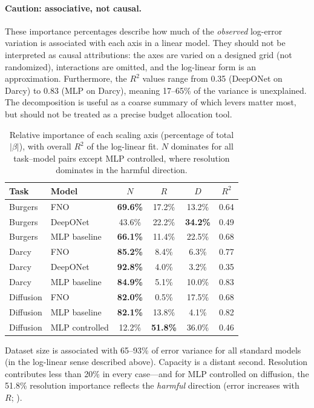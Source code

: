 \documentclass[11pt]{article}
\begin{document}
\paragraph{Caution: associative, not causal.}
These importance percentages describe how much of the \emph{observed}
log-error variation is associated with each axis in a linear model.
They should not be interpreted as causal attributions: the axes are
varied on a designed grid (not randomized), interactions are omitted,
and the log-linear form is an approximation.
Furthermore, the $R^2$ values range from 0.35 (DeepONet on Darcy)
to 0.83 (MLP on Darcy), meaning 17--65\% of the variance is
unexplained.
The decomposition is useful as a coarse summary of which levers
matter most, but should not be treated as a precise budget
allocation tool.

\begin{table}[h]
\centering
\caption{Relative importance of each scaling axis
(percentage of total $|\beta|$), with overall $R^2$ of the
log-linear fit. $N$ dominates for all task--model pairs
except MLP controlled, where resolution dominates in the
harmful direction.}
\label{tab:importance}
\begin{tabular}{@{}llcccc@{}}
\toprule
\textbf{Task} & \textbf{Model} & $N$ & $R$ & $D$ & $R^2$ \\
\midrule
Burgers   & FNO          & \textbf{69.6\%} & 17.2\% & 13.2\% & 0.64 \\
Burgers   & DeepONet     & 43.6\% & 22.2\% & \textbf{34.2\%} & 0.49 \\
Burgers   & MLP baseline & \textbf{66.1\%} & 11.4\% & 22.5\% & 0.68 \\
Darcy     & FNO          & \textbf{85.2\%} & 8.4\%  & 6.3\%  & 0.77 \\
Darcy     & DeepONet     & \textbf{92.8\%} & 4.0\%  & 3.2\%  & 0.35 \\
Darcy     & MLP baseline & \textbf{84.9\%} & 5.1\%  & 10.0\% & 0.83 \\
Diffusion & FNO          & \textbf{82.0\%} & 0.5\%  & 17.5\% & 0.68 \\
Diffusion & MLP baseline & \textbf{82.1\%} & 13.8\% & 4.1\%  & 0.82 \\
Diffusion & MLP controlled & 12.2\% & \textbf{51.8\%} & 36.0\% & 0.46 \\
\bottomrule
\end{tabular}
\end{table}

Dataset size is associated with 65--93\% of error variance for all
standard models (in the log-linear sense described above).
Capacity is a distant second. Resolution contributes less
than 20\% in every case---and for MLP controlled on diffusion, the
51.8\% resolution importance reflects the \emph{harmful} direction
(error increases with~$R$; ).
\end{document}
